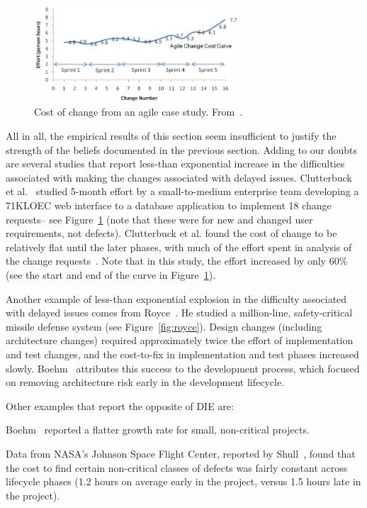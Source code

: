 \begin{figure}[!t]
 \includegraphics[width=3in]{img/clutterbuck.png} 
 \caption{Cost of change from an agile case study. From~\cite{Clutterbuck09}.}\label{fig:clutterbuck}
 \end{figure}

 
 
 All in all, the empirical results of this section seem insufficient to justify
 the strength of the beliefs documented in the previous section. Adding to our doubts are  several studies that report less-than exponential
 increase in the difficulties associated with making the changes associated with delayed
 issues. 
Clutterbuck et al.~\cite{Clutterbuck09} studied 5-month effort by a small-to-medium enterprise team developing a 71KLOEC web interface to a database application to implement 18 change requests-- see Figure~\ref{fig:clutterbuck} (note that these were for new and changed user requirements, not defects). Clutterbuck et al. found the cost of change to be relatively flat until the later phases, with much of the effort spent in analysis of the change requests~\cite{Clutterbuck09}. Note that in this study, the effort increased by only 60\% (see the start and end of the curve in Figure~\ref{fig:clutterbuck}).




 
Another example of less-than exponential explosion in the difficulty associated with delayed issues comes from  Royce~\cite{Royce98}. He
studied  a million-line, safety-critical missile defense system
(see  Figure~\ref{fig:royce}). Design changes (including architecture changes) required approximately twice the effort of implementation and test changes, and the cost-to-fix in implementation and test phases increased slowly. Boehm~\cite{Boehm10} attributes this success to the  development process, which focused on removing architecture risk early in the development lifecycle.
 
 Other examples that report the opposite of DIE are:
  \bi
  \item
  Boehm~\cite{Boehm80} reported a flatter growth rate for small, non-critical projects.
   \item 
  Data from NASA's Johnson Space Flight Center, reported by Shull~\cite{Shull02}, found that the cost to find certain non-critical classes of defects was fairly constant across lifecycle phases (1.2 hours on average early in the project, versus 1.5 hours late in the project). 
   
